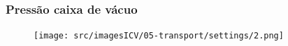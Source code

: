\newpage
\thispagestyle{fancy}
\vspace*{40 pt}
\subsubsection{\small{Pressão caixa de vácuo}} \label{sec:telaConfiguracoesTransportePressaoCaixaVaco}
\vspace*{\fill}
\begin{figure}[h]
    \centering
    \texttt{[image: src/imagesICV/05-transport/settings/2.png]}
\end{figure}
\vspace*{\fill}
